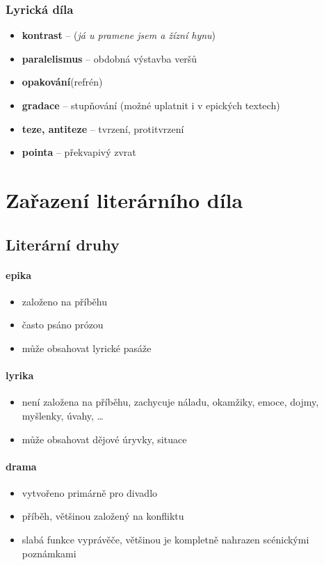 \documentclass[10pt,a4paper]{article}
\begin{document}
\subsubsection{Lyrická díla}
\begin{itemize}
\item[] \textbf{kontrast} -- (\textit{já u pramene jsem a žízní hynu})
\item[] \textbf{paralelismus} -- obdobná výstavba veršů
\item[] \textbf{opakování}(refrén)
\item[] \textbf{gradace} -- stupňování (možné uplatnit i v epických textech)
\item[] \textbf{teze, antiteze} -- tvrzení, protitvrzení
\item[] \textbf{pointa} -- překvapivý zvrat
\end{itemize}

\section{Zařazení literárního díla}
\subsection{Literární druhy}
\paragraph{epika} 
\begin{itemize}
\item založeno na příběhu
\item často psáno prózou
\item může obsahovat lyrické pasáže 
\end{itemize}

\paragraph{lyrika}
\begin{itemize}
\item není založena na příběhu, zachycuje náladu, okamžiky, emoce, dojmy, myšlenky, úvahy, \ldots
\item může obsahovat dějové úryvky, situace
\end{itemize}

\paragraph{drama}
\begin{itemize}
\item vytvořeno primárně pro divadlo
\item příběh, většinou založený na konfliktu
\item slabá funkce vyprávěče, většinou je kompletně nahrazen scénickými poznámkami
\end{itemize}
\end{document}
